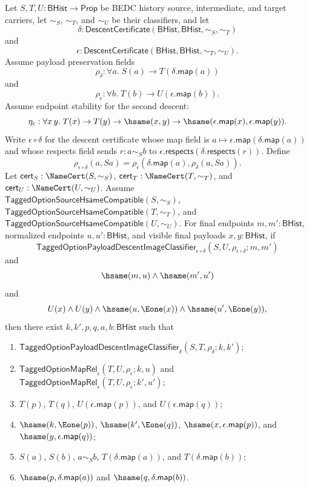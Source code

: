 \begin{theorem}
Let $S,T,U:\mathsf{BHist}\to\mathsf{Prop}$ be BEDC history source,
intermediate, and target carriers, let $\sim_S$, $\sim_T$, and $\sim_U$ be their
classifiers, and let
$$
\delta:\mathsf{DescentCertificate}(\mathsf{BHist},\mathsf{BHist},\sim_S,\sim_T)
$$
and
$$
\epsilon:\mathsf{DescentCertificate}(\mathsf{BHist},\mathsf{BHist},\sim_T,\sim_U).
$$
Assume payload preservation fields
$$
\rho_{\delta}:\forall a.\;S(a)\to T(\delta.\mathsf{map}(a))
$$
and
$$
\rho_{\epsilon}:\forall b.\;T(b)\to U(\epsilon.\mathsf{map}(b)).
$$
Assume endpoint stability for the second descent:
$$
\eta_{\epsilon}:\forall x\,y.\;
T(x)\to T(y)\to \hsame(x,y)\to
\hsame(\epsilon.\mathsf{map}(x),\epsilon.\mathsf{map}(y)).
$$
Write $\epsilon\circ\delta$ for the descent certificate whose map field is
$a\mapsto\epsilon.\mathsf{map}(\delta.\mathsf{map}(a))$ and whose respects field
sends $r:a\sim_S b$ to
$\epsilon.\mathsf{respects}(\delta.\mathsf{respects}(r))$. Define
$$
\rho_{\epsilon\circ\delta}(a,Sa)=
\rho_{\epsilon}(\delta.\mathsf{map}(a),\rho_{\delta}(a,Sa)).
$$
Let $\mathsf{cert}_S:\NameCert(S,\sim_S)$,
$\mathsf{cert}_T:\NameCert(T,\sim_T)$, and
$\mathsf{cert}_U:\NameCert(U,\sim_U)$. Assume
$\mathsf{TaggedOptionSourceHsameCompatible}(S,\sim_S)$,
$\mathsf{TaggedOptionSourceHsameCompatible}(T,\sim_T)$, and
$\mathsf{TaggedOptionSourceHsameCompatible}(U,\sim_U)$. For final endpoints
$m,m':\mathsf{BHist}$, normalized endpoints $u,u':\mathsf{BHist}$, and visible
final payloads $x,y:\mathsf{BHist}$, if
$$
\mathsf{TaggedOptionPayloadDescentImageClassifier}_{\epsilon\circ\delta}
(S,U,\rho_{\epsilon\circ\delta};m,m')
$$
and
$$
\hsame(m,u)\land \hsame(m',u')
$$
and
$$
U(x)\land U(y)\land \hsame(u,\Eone(x))\land \hsame(u',\Eone(y)),
$$
then there exist $k,k',p,q,a,b:\mathsf{BHist}$ such that
\begin{enumerate}
\item $\mathsf{TaggedOptionPayloadDescentImageClassifier}_{\delta}
(S,T,\rho_{\delta};k,k')$;
\item $\mathsf{TaggedOptionMapRel}_{\epsilon}(T,U,\rho_{\epsilon};k,u)$ and
$\mathsf{TaggedOptionMapRel}_{\epsilon}(T,U,\rho_{\epsilon};k',u')$;
\item $T(p)$, $T(q)$, $U(\epsilon.\mathsf{map}(p))$, and
$U(\epsilon.\mathsf{map}(q))$;
\item $\hsame(k,\Eone(p))$, $\hsame(k',\Eone(q))$,
$\hsame(x,\epsilon.\mathsf{map}(p))$, and
$\hsame(y,\epsilon.\mathsf{map}(q))$;
\item $S(a)$, $S(b)$, $a\sim_S b$,
$T(\delta.\mathsf{map}(a))$, and $T(\delta.\mathsf{map}(b))$;
\item $\hsame(p,\delta.\mathsf{map}(a))$ and
$\hsame(q,\delta.\mathsf{map}(b))$.
\end{enumerate}
\end{theorem}

